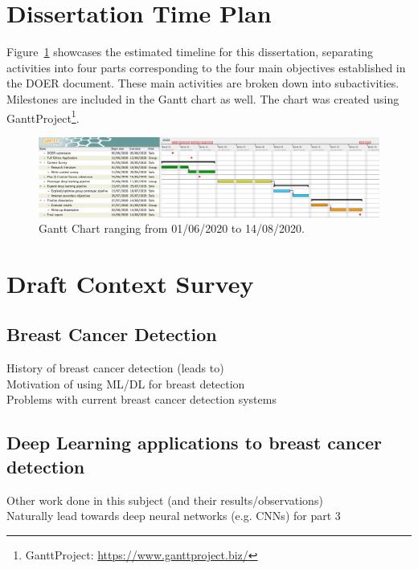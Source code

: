 \documentclass[letterpaper,12pt]{article}
\begin{document}
\section{Dissertation Time Plan}
\label{sec:time-plan}

Figure~\ref{fig:gantt_chart} showcases the estimated timeline for this dissertation, separating activities into four parts corresponding to the four main objectives established in the DOER document. These main activities are broken down into subactivities. Milestones are included in the Gantt chart as well. The chart was created using GanttProject\footnote{GanttProject: \url{https://www.ganttproject.biz/}}.

\begin{figure}[h]
\centerline{\includegraphics[width=\textwidth]{Plan & Draft Context Survey/figures/gantt_chart.png}}
\caption{\label{fig:gantt_chart}Gantt Chart ranging from 01/06/2020 to 14/08/2020.}
\end{figure}



\section{Draft Context Survey}
\label{sec:draft-context-survey}

\subsection{Breast Cancer Detection}
History of breast cancer detection (leads to)\\
Motivation of using ML/DL for breast detection\\
Problems with current breast cancer detection systems

\subsection{Deep Learning applications to breast cancer detection}
Other work done in this subject (and their results/observations)\\
Naturally lead towards deep neural networks (e.g. CNNs) for part 3
\end{document}
